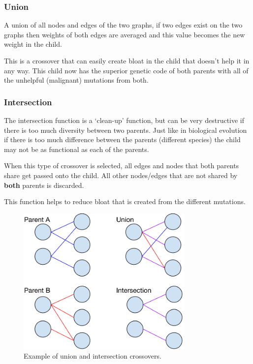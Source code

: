 \documentclass[journal]{IEEEtran}
\begin{document}
    \subsubsection{Union}
    A union of all nodes and edges of the two graphs, if two edges exist on the two graphs then
    weights of both edges are averaged and this value becomes the new weight in the child.

    This is a crossover that can easily create bloat in the child that doesn't help it in any way.
    This child now has the superior genetic code of both parents with all of the unhelpful (malignant)
    mutations from both. \cite{lachlan} %

    \subsubsection{Intersection}
    The intersection function is a `clean-up' function, but can be very destructive if there
    is too much diversity between two parents. Just like in biological evolution if there is
    too much difference between the parents (different species) the child may not be as functional
    as each of the parents.

    When this type of crossover is selected, all edges and nodes that both parents share get
    passed onto the child. All other nodes/edges that are not shared by \textbf{both} parents
    is discarded.  \cite{lachlan}

    This function helps to reduce bloat that is created from the different mutations.

    \begin{figure}[!here]%
      \centering
      \includegraphics[width=3.4in]{ga_union_intersect}
      \caption{Example of union and intersection crossovers.}
      \label{fig:ga_union_intersect}
    \end{figure}
\end{document}
